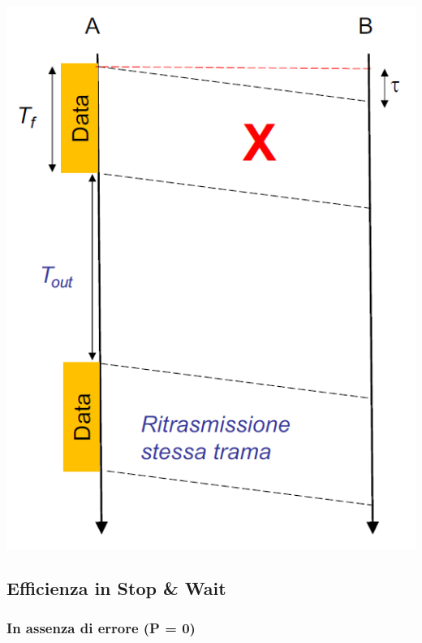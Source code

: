 \documentclass[12pt]{article}
\begin{document}
\begin{center}
    \includegraphics[scale=0.3]{stop_and_wait_with_timeout}
\end{center}

\subsection{Efficienza in Stop \& Wait}

\subsubsection{In assenza di errore (P = 0)}
\end{document}
